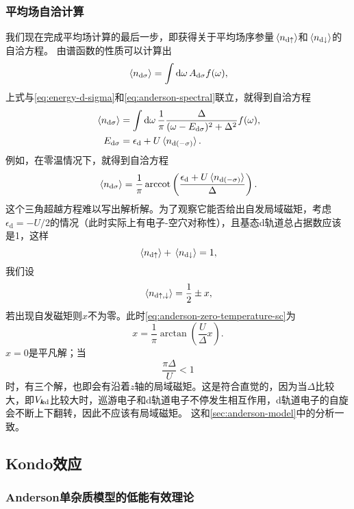 \subsubsection{平均场自洽计算}

我们现在完成平均场计算的最后一步，即获得关于平均场序参量$\expval*{{n}_{\text{d} \uparrow}}$和$\expval*{{n}_{\text{d} \downarrow}}$的自洽方程。
由谱函数的性质可以计算出
\[
    \expval*{{n}_{\text{d} \sigma}} = \int \dd{\omega} A_{\text{d} \sigma} f(\omega),
\]
上式与\eqref{eq:energy-d-sigma}和\eqref{eq:anderson-spectral}联立，就得到自洽方程
\begin{equation}
    \begin{aligned}
        \expval*{{n}_{\text{d} \sigma}} &= \int \dd{\omega} \frac{1}{\pi} \frac{\Delta}{(\omega-E_{\text{d}\sigma})^2 + \Delta^2} f(\omega), \\
        E_{\text{d} \sigma} &= \epsilon_\text{d} + U \expval*{{n}_{\text{d} (-\sigma)}}.
    \end{aligned}
\end{equation}
例如，在零温情况下，就得到自洽方程
\begin{equation}
    \expval*{{n}_{\text{d} \sigma}} = \frac{1}{\pi} \arccot \left( \frac{\epsilon_{\text{d}} + U \expval*{{n}_{\text{d} (-\sigma)}}}{\Delta} \right).
    \label{eq:anderson-zero-temperature-sc}
\end{equation}
这个三角超越方程难以写出解析解。为了观察它能否给出自发局域磁矩，考虑$\epsilon_{\text{d}} = - U / 2$的情况（此时实际上有电子-空穴对称性），且基态d轨道总占据数应该是1，这样
\[
    \expval*{{n}_{\text{d} \uparrow}} + \expval*{{n}_{\text{d} \downarrow}} = 1,
\]
我们设
\[
    \expval*{{n}_{\text{d} \uparrow, \downarrow}} = \frac{1}{2} \pm x,
\]
若出现自发磁矩则$x$不为零。此时\eqref{eq:anderson-zero-temperature-sc}为
\[
    x = \frac{1}{\pi} \arctan \left( \frac{U}{\Delta} x \right).
\]
$x=0$是平凡解；当
\[
    \frac{\pi \Delta}{U} < 1
\]
时，有三个解，也即会有沿着$z$轴的局域磁矩。这是符合直觉的，因为当$\Delta$比较大，即$V_{\vb*{k} \text{d}}$比较大时，巡游电子和d轨道电子不停发生相互作用，d轨道电子的自旋会不断上下翻转，因此不应该有局域磁矩。
这和\autoref{sec:anderson-model}中的分析一致。

\subsection{Kondo效应}\label{sec:kondo-effect}

\subsubsection{Anderson单杂质模型的低能有效理论}

